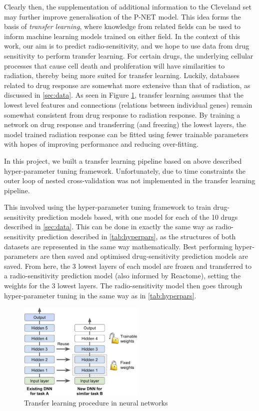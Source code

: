 \documentclass[NOTE, disdraft=true, UKenglish]{\DISCDTLATEXPATH UCLCDTDISdoc}
\begin{document}
Clearly then, the supplementation of additional information to the Cleveland set may further improve generalisation of the P-NET model. This idea forms the basis of \textit{transfer learning}, where knowledge from related fields can be used to inform machine learning models trained on either field. In the context of this work, our aim is to predict radio-sensitivity, and we hope to use data from drug sensitivity to perform transfer learning. For certain drugs, the underlying cellular processes that cause cell death and proliferation will have similarities to radiation, thereby being more suited for transfer learning. Luckily, databases related to drug response are somewhat more extensive than that of radiation, as discussed in \ref{sec:data}. As seen in Figure \ref{fig:3}, transfer learning assumes that the lowest level features and connections (relations between individual genes) remain somewhat consistent from drug response to radiation response. By training a network on drug response and transferring (and freezing) the lowest layers, the model trained radiation response can be fitted using fewer trainable parameters with hopes of improving performance and reducing over-fitting.

In this project, we built a transfer learning pipeline based on above described hyper-parameter tuning framework. Unfortunately, due to time constraints the outer loop of nested cross-validation was not implemented in the transfer learning pipeline. 

This involved using the hyper-parameter tuning framework to train drug-sensitivity prediction models based, with one model for each of the 10 drugs described in \ref{sec:data}. This can be done in exactly the same way as radio-sensitivity prediction described in \ref{tab:hyperpars}, as the structures of both datasets are represented in the same way mathematically. Best performing hyper-parameters are then saved and optimised drug-sensitivity prediction models are saved. From here, the 3 lowest layers of each model are frozen and transferred to a radio-sensitivity prediction model (also informed by Reactome), setting the weights for the 3 lowest layers. The radio-sensitivity model then goes through hyper-parameter tuning in the same way as in \ref{tab:hyperpars}.
\begin{figure}
    \centering
    \includegraphics[width=6cm]{Figures/transfer_learning.png}
    \caption{Transfer learning procedure in neural networks \cite{McEwann lecture}}
    \label{fig:3}
\end{figure}
\end{document}
